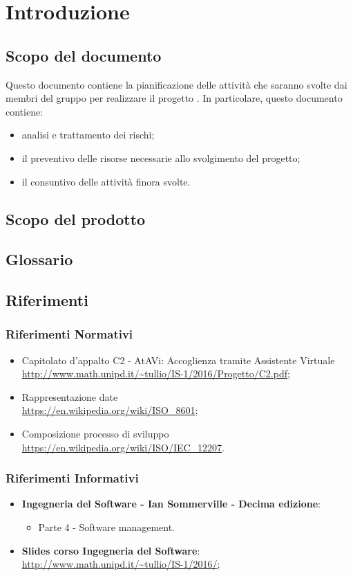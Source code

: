 \section{Introduzione}
	\subsection{Scopo del documento}
	Questo documento contiene la pianificazione delle attività che saranno svolte dai membri del gruppo \GRUPPO{} per realizzare il progetto \PROGETTO. In particolare, questo documento contiene:
	\begin{itemize}
		\item analisi e trattamento dei rischi;
		\item il preventivo delle risorse necessarie allo svolgimento del progetto;
		\item il consuntivo delle attività finora svolte.
	\end{itemize}	
	\subsection{Scopo del prodotto}
		\SCOPO
	\subsection{Glossario}
		\GLOSSARIO
	\subsection{Riferimenti}
	\subsubsection{Riferimenti Normativi}
		\begin{itemize}
			\item Capitolato d'appalto C2 - AtAVi: Accoglienza tramite Assistente Virtuale \\
			\url{http://www.math.unipd.it/~tullio/IS-1/2016/Progetto/C2.pdf};
			\item Rappresentazione date \\
			\url{https://en.wikipedia.org/wiki/ISO_8601};
			\item Composizione processo di sviluppo \\
			\url{https://en.wikipedia.org/wiki/ISO/IEC_12207}.

	\end{itemize}
	    \subsubsection{Riferimenti Informativi}
	    	\begin{itemize}
	    		\item \textbf{Ingegneria del Software - Ian Sommerville - Decima edizione}:
	    		\begin{itemize}
	    			\item Parte 4 - Software management.
	    		\end{itemize}
	    		\item \textbf{Slides corso Ingegneria del Software}: \\ \url{http://www.math.unipd.it/~tullio/IS-1/2016/};
	    	\end{itemize}
	    
